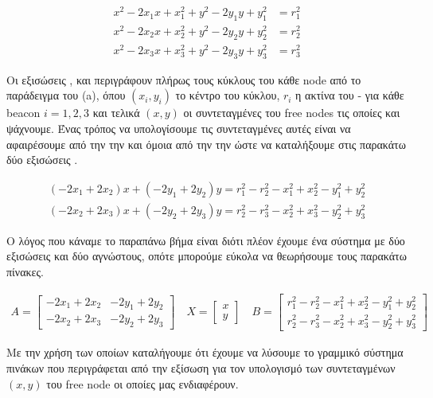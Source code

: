 \begin{align}
	x^2-2 x_1 x + x_1^2 + y^2-2 y_1 y + y_1^2 &= r_1^2 \label{eq:trilateration-b1} \\ 
	x^2-2 x_2 x + x_2^2 + y^2-2 y_2 y + y_2^2 &= r_2^2 \label{eq:trilateration-b2} \\
	x^2-2 x_3 x + x_3^2 + y^2-2 y_3 y + y_3^2 &= r_3^2 \label{eq:trilateration-b3} 
\end{align}

Οι εξισώσεις ,  και  περιγράφουν πλήρως τους κύκλους του κάθε node από το παράδειγμα 
του  (a),
όπου $(x_i,y_i)$ το κέντρο του κύκλου, $r_i$ η ακτίνα του - για κάθε beacon $i=1,2,3$ και τελικά $(x,y)$ οι συντεταγμένες του free nodes τις οποίες και ψάχνουμε. 
Ένας τρόπος να υπολογίσουμε τις συντεταγμένες αυτές είναι να αφαιρέσουμε από την  την  και όμοια από την 
 την  ώστε να καταλήξουμε στις παρακάτω δύο εξισώσεις \cite{trilateration-equations} \cite{localization-algorithms-for-wsn}.

\begin{align}
	(-2x_1+2x_2)x + (-2y_1+2y_2)y = r_1^2 - r_2^2 - x_1^2 + x_2^2 - y_1^2 + y_2^2  \nonumber \\
	(-2x_2+2x_3)x + (-2y_2+2y_3)y = r_2^2 - r_3^2 - x_2^2 + x_3^2 - y_2^2 + y_3^2  \nonumber
\end{align}

Ο λόγος που κάναμε το παραπάνω βήμα είναι διότι πλέον έχουμε ένα σύστημα με δύο εξισώσεις και δύο αγνώστους, οπότε μπορούμε εύκολα να θεωρήσουμε τους παρακάτω πίνακες.

\begin{align}
	A = \begin{bmatrix} -2x_1+2x_2 & -2y_1+2y_2 \\ -2x_2+2x_3 & -2y_2+2y_3 \end{bmatrix} \nonumber \quad
	X = \begin{bmatrix} x \\ y \end{bmatrix} \nonumber \quad
	B = \begin{bmatrix} r_1^2 - r_2^2 - x_1^2 + x_2^2 - y_1^2 + y_2^2 \\ r_2^2 - r_3^2 - x_2^2 + x_3^2 - y_2^2 + y_3^2 \end{bmatrix} \nonumber
\end{align}

Με την χρήση των οποίων καταλήγουμε ότι έχουμε να λύσουμε το γραμμικό σύστημα πινάκων που περιγράφεται από την εξίσωση  για τον
υπολογισμό των συντεταγμένων $(x,y)$ του free node οι οποίες μας ενδιαφέρουν.

